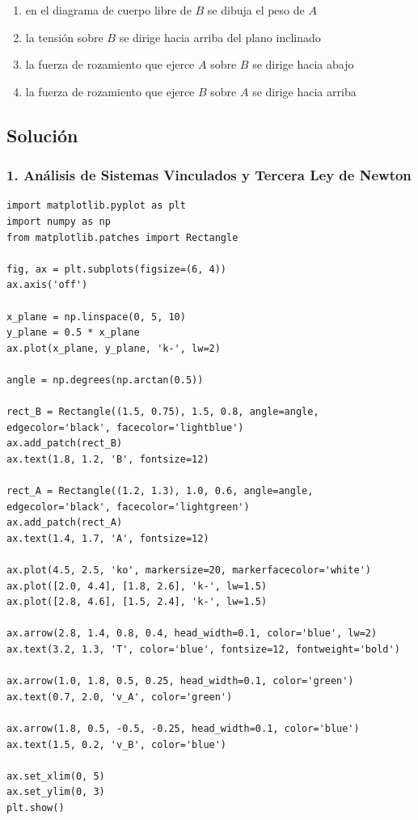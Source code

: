 \documentclass[12pt, a4paper]{article}
\begin{document}
\begin{enumerate}[label=\alph*)]
    \item en el diagrama de cuerpo libre de $B$ se dibuja el peso de $A$
    \item la tensión sobre $B$ se dirige hacia arriba del plano inclinado
    \item la fuerza de rozamiento que ejerce $A$ sobre $B$ se dirige hacia abajo
    \item la fuerza de rozamiento que ejerce $B$ sobre $A$ se dirige hacia arriba
\end{enumerate}

\subsection*{Solución}

\subsubsection*{1. Análisis de Sistemas Vinculados y Tercera Ley de Newton}

\begin{verbatim}
import matplotlib.pyplot as plt
import numpy as np
from matplotlib.patches import Rectangle

fig, ax = plt.subplots(figsize=(6, 4))
ax.axis('off')

x_plane = np.linspace(0, 5, 10)
y_plane = 0.5 * x_plane
ax.plot(x_plane, y_plane, 'k-', lw=2)

angle = np.degrees(np.arctan(0.5))

rect_B = Rectangle((1.5, 0.75), 1.5, 0.8, angle=angle, edgecolor='black', facecolor='lightblue')
ax.add_patch(rect_B)
ax.text(1.8, 1.2, 'B', fontsize=12)

rect_A = Rectangle((1.2, 1.3), 1.0, 0.6, angle=angle, edgecolor='black', facecolor='lightgreen')
ax.add_patch(rect_A)
ax.text(1.4, 1.7, 'A', fontsize=12)

ax.plot(4.5, 2.5, 'ko', markersize=20, markerfacecolor='white')
ax.plot([2.0, 4.4], [1.8, 2.6], 'k-', lw=1.5)
ax.plot([2.8, 4.6], [1.5, 2.4], 'k-', lw=1.5)

ax.arrow(2.8, 1.4, 0.8, 0.4, head_width=0.1, color='blue', lw=2)
ax.text(3.2, 1.3, 'T', color='blue', fontsize=12, fontweight='bold')

ax.arrow(1.0, 1.8, 0.5, 0.25, head_width=0.1, color='green')
ax.text(0.7, 2.0, 'v_A', color='green')

ax.arrow(1.8, 0.5, -0.5, -0.25, head_width=0.1, color='blue')
ax.text(1.5, 0.2, 'v_B', color='blue')

ax.set_xlim(0, 5)
ax.set_ylim(0, 3)
plt.show()
\end{verbatim}
\end{document}
